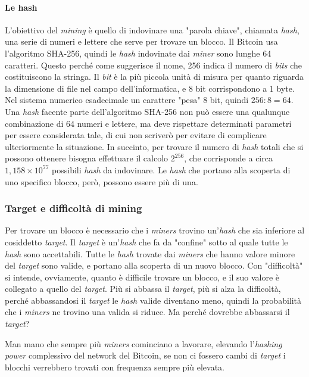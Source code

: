 \documentclass {article}
\begin{document}
\paragraph {Le hash}

L'obiettivo del \textit{mining} è quello di indovinare una "parola chiave", chiamata \textit{hash}, una serie di numeri e lettere che serve per trovare un blocco.
Il Bitcoin usa l'algoritmo SHA-256, quindi le \textit{hash} indovinate dai \textit{miner} sono lunghe 64 caratteri.
Questo perché come suggerisce il nome, 256 indica il numero di \textit{bits} che costituiscono la stringa.
Il \textit{bit} è la più piccola unità di misura per quanto riguarda la dimensione di file nel campo dell'informatica, e 8 bit corrispondono a 1 byte.
Nel sistema numerico esadecimale un carattere "pesa" 8 bit, quindi $256 : 8 = 64$.
Una \textit{hash} facente parte dell'algoritmo SHA-256 non può essere una qualunque combinazione di 64 numeri e lettere, ma deve rispettare determinati parametri per essere considerata tale, di cui non scriverò per evitare di complicare ulteriormente la situazione.
In succinto, per trovare il numero di \textit{hash} totali che si possono ottenere bisogna effettuare il  calcolo $2^{256}$, che corrisponde a circa $1,158 \times 10^{77}$ possibili \textit{hash} da indovinare.
Le \textit{hash} che portano alla scoperta di uno specifico blocco, però, possono essere più di una.

\subsubsection {Target e difficoltà di mining}

Per trovare un blocco è necessario che i \textit{miners} trovino un'\textit{hash} che sia inferiore al cosiddetto \textit{target}. Il \textit{target} è un'\textit{hash} che fa da "confine" sotto al quale tutte le \textit{hash} sono accettabili.
Tutte le \textit{hash} trovate dai \textit{miners} che hanno valore minore del \textit{target} sono valide, e portano alla scoperta di un nuovo blocco.
Con "difficoltà" si intende, ovviamente, quanto è difficile trovare un blocco, e il suo valore è collegato a quello del \textit{target}.
Più si abbassa il \textit{target}, più si alza la difficoltà, perché abbassandosi il \textit{target} le \textit{hash} valide diventano meno, quindi la probabilità che i \textit{miners} ne trovino una valida si riduce.
Ma perché dovrebbe abbassarsi il \textit{target}?

Man mano che sempre più \textit{miners} cominciano a lavorare, elevando l'\textit{hashing power} complessivo del network del Bitcoin, se non ci fossero cambi di \textit{target} i blocchi verrebbero trovati con frequenza sempre più elevata.
\end{document}
